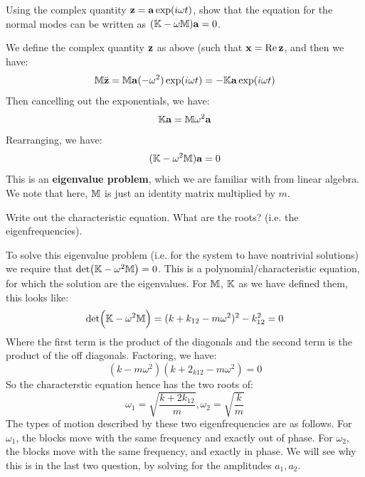 \begin{p}
Using the complex quantity $\mathbf{z} = \mathbf{a}\exp(i\omega t)$, show that the equation for the normal modes can be written as $(\mathbb{K} - \omega\mathbb{M})\mathbf{a} = 0$.
\end{p}
\begin{s}
We define the complex quantity $\mathbf{z}$ as above (such that $\mathbf{x} = \Re\mathbf{z}$, and then we have:
\[\mathbb{M}\ddot{\mathbf{z}} = \mathbb{M}\mathbf{a}(-\omega^2)\exp(i\omega t) = -\mathbb{K}\mathbf{a}\exp(i\omega t)\]
Then cancelling out the exponentials, we have:
\[\mathbb{K}\mathbf{a} = \mathbb{M}\omega^2\mathbf{a}\]
Rearranging, we have:
\[(\mathbb{K} - \omega^2\mathbb{M})\mathbf{a} = 0\]
This is an \textbf{eigenvalue problem}, which we are familiar with from linear algebra. We note that here, $\mathbb{M}$ is just an identity matrix multiplied by $m$.
\end{s}

\begin{p}
Write out the characteristic equation. What are the roots? (i.e. the eigenfrequencies).
\end{p}
\begin{s}
To solve this eigenvalue problem (i.e. for the system to have nontrivial solutions) we require that $\det(\mathbb{K} - \omega^2\mathbb{M}) = 0$. This is a polynomial/characteristic equation, for which the solution are the eigenvalues. For $\mathbb{M}$, $\mathbb{K}$ as we have defined them, this looks like:
\[\det(\mathbb{K} - \omega^2\mathbb{M}) = (k + k_{12}- m\omega^2)^2 - k_{12}^2 = 0\]
Where the first term is the product of the diagonals and the second term is the product of the off diagonals. Factoring, we have:
\[(k - m\omega^2)(k + 2_{k12} - m\omega^2) = 0\]
So the characterstic equation hence has the two roots of:
\[\omega_1 = \sqrt{\frac{k + 2k_{12}}{m}}, \omega_2 = \sqrt{\frac{k}{m}}\]
The types of motion described by these two eigenfrequencies are as follows. For $\omega_1$, the blocks move with the same frequency and exactly out of phase. For $\omega_2$, the blocks move with the same frequency, and exactly in phase. We will see why this is in the last two question, by solving for the amplitudes $a_1, a_2$.
\end{s}

